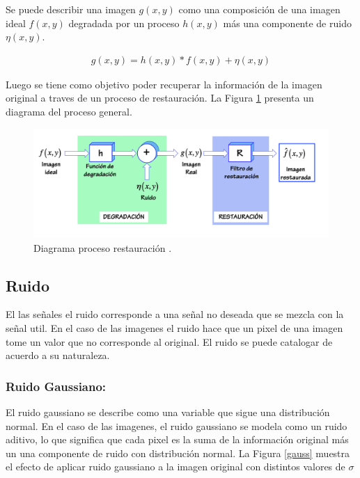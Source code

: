 \documentclass[
  letterpaper,
  twocolumn,
  9pt,
  journal,
  final]{IEEEtran}
\begin{document}
Se puede describir una imagen $g(x,y)$ como una composición de una imagen ideal $f(x,y)$ degradada por un proceso $h(x,y)$ más una componente de ruido $\eta(x,y)$.

\begin{align}
  g(x,y) = h(x, y) * f(x,y) + \eta(x,y)
\end{align}

Luego se tiene como objetivo poder recuperar la información de la imagen original a traves de un proceso de restauración. La Figura \ref{restauracion} presenta un diagrama del proceso general.

\begin{figure}[h!]
	\centering
	\includegraphics[width=0.8\linewidth, trim={0cm 0cm 1cm 0cmm}, clip]{other/restauracion.png}
	\caption{Diagrama proceso restauración \cite{carrasco3}.}
	\label{restauracion}
\end{figure}


\subsection{Ruido}

El las señales el ruido corresponde a una señal no deseada que se mezcla con la señal util. En el caso de las imagenes el ruido hace que un pixel de una imagen tome un valor que no corresponde al original. El ruido se puede catalogar de acuerdo a su naturaleza.

\subsubsection{Ruido Gaussiano:}
El ruido gaussiano se describe como una variable que sigue una distribución normal. En el caso de las imagenes, el ruido gaussiano se modela como un ruido aditivo, lo que significa que cada pixel es la suma de la información original más un una componente de ruido con distribución normal. La Figura \ref{gauss} muestra el efecto de aplicar ruido gaussiano a la imagen original con distintos valores de $\sigma$
\end{document}
